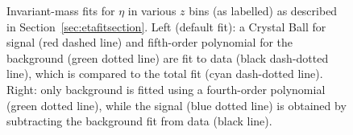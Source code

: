 \begin{figure}[H]
\label{fig:etazfit}
\caption[Invariant-mass fits for $\eta$ in various \(z\) bins]{Invariant-mass fits for $\eta$ in various \(z\) bins (as labelled) as described in Section~\ref{sec:etafitsection}. Left (default fit):  a Crystal Ball for signal (red dashed line) and fifth-order polynomial for the background (green dotted line) are fit to data (black dash-dotted line), which is compared to the total fit  (cyan dash-dotted line). Right: only background is fitted using a fourth-order polynomial (green dotted line), while the signal (blue dotted line) is obtained by subtracting the background fit from data (black line).}
\end{figure}
